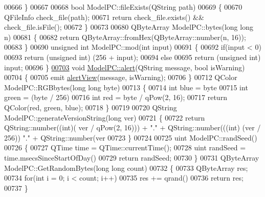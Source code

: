 \begin{DoxyCode}
{00666 \}
00667 
00668 \textcolor{keywordtype}{bool} ModelPC::fileExists(QString path)
00669 \{
00670     QFileInfo check\_file(path);
00671     \textcolor{keywordflow}{return} check\_file.exists() && check\_file.isFile();
00672 \}
00673 
00680 QByteArray ModelPC::bytes(\textcolor{keywordtype}{long} \textcolor{keywordtype}{long} n)
00681 \{
00682     \textcolor{keywordflow}{return} QByteArray::fromHex(QByteArray::number(n, 16));
00683 \}
00690 \textcolor{keywordtype}{unsigned} \textcolor{keywordtype}{int} ModelPC::mod(\textcolor{keywordtype}{int} input)
00691 \{
00692     \textcolor{keywordflow}{if}(input < 0)
00693         \textcolor{keywordflow}{return} (\textcolor{keywordtype}{unsigned} \textcolor{keywordtype}{int}) (256 + input);
00694     \textcolor{keywordflow}{else}
00695         \textcolor{keywordflow}{return} (\textcolor{keywordtype}{unsigned} \textcolor{keywordtype}{int}) input;
00696 \}
\hypertarget{modelpc_8cpp_source_l00703}{}\hyperlink{class_model_p_c_a9079a101d83672aa48fd2dbac797de40}{00703} \textcolor{keywordtype}{void} \hyperlink{class_model_p_c_a9079a101d83672aa48fd2dbac797de40}{ModelPC::alert}(QString message, \textcolor{keywordtype}{bool} isWarning)
00704 \{
00705     emit \hyperlink{class_model_p_c_af0217a7ca5671e26090dc50a5dccdaf5}{alertView}(message, isWarning);
00706 \}
00712 QColor ModelPC::RGBbytes(\textcolor{keywordtype}{long} \textcolor{keywordtype}{long} byte)
00713 \{
00714     \textcolor{keywordtype}{int} blue = byte %
00715     \textcolor{keywordtype}{int} green = (byte / 256) %
00716     \textcolor{keywordtype}{int} red = byte / qPow(2, 16);
00717     \textcolor{keywordflow}{return} QColor(red, green, blue);
00718 \}
00719 
00720 QString ModelPC::generateVersionString(\textcolor{keywordtype}{long} ver)
00721 \{
00722     \textcolor{keywordflow}{return} QString::number((\textcolor{keywordtype}{int})( ver / qPow(2, 16))) + \textcolor{stringliteral}{"."} + QString::number(((\textcolor{keywordtype}{int}) (ver / 256)) %
      "."} + QString::number(ver %
00723 \}
00724 
00725 uint ModelPC::randSeed()
00726 \{
00727     QTime time = QTime::currentTime();
00728     uint randSeed = time.msecsSinceStartOfDay() %
00729     \textcolor{keywordflow}{return} randSeed;
00730 \}
00731 QByteArray ModelPC::GetRandomBytes(\textcolor{keywordtype}{long} \textcolor{keywordtype}{long} count)
00732 \{
00733     QByteArray res;
00734     \textcolor{keywordflow}{for}(\textcolor{keywordtype}{int} i = 0; i < count; i++)
00735        res += qrand() %
00736     \textcolor{keywordflow}{return} res;
00737 \}
\end{DoxyCode}
